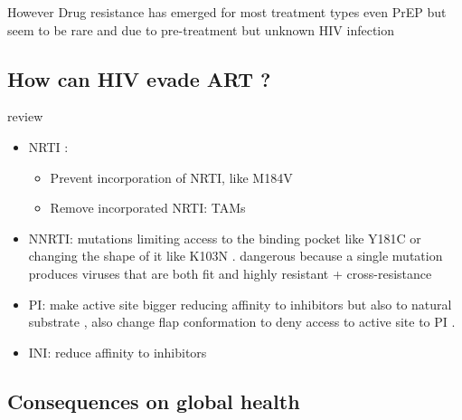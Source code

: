 \documentclass[
  11pt,
  twoside]{scrbook}
\providecommand{\tightlist}{%
  \setlength{\itemsep}{0pt}\setlength{\parskip}{0pt}}
\begin{document}
However Drug resistance has emerged for most treatment types even PrEP \autocite{knoxMultidrugResistantHIV1Infection2017,hurtPreexposureProphylaxisAntiretroviral2011} but seem to be rare and due to pre-treatment but unknown HIV infection \autocite{gibasDrugResistanceHIV2019}

\hypertarget{how-can-hiv-evade-art}{%
\subsection{How can HIV evade ART ?}\label{how-can-hiv-evade-art}}

review \autocite{ammaranondMechanismHIVAntiretroviral2012,clavelHIVDrugResistance2004}

\begin{itemize}
\tightlist
\item
  NRTI \autocite{menendez-ariasMechanismsResistanceNucleoside2008,sluis-cremerMolecularMechanismsHIV12000}:

  \begin{itemize}
  \item
    Prevent incorporation of NRTI, like M184V \autocite{sarafianosLamivudine3TCResistance1999}
  \item
    Remove incorporated NRTI: TAMs \autocite{meyerMechanismAZTResistance1999,boyerSelectiveExcisionAZTMP2001}
  \end{itemize}
\item
  NNRTI: mutations limiting access to the binding pocket like Y181C or changing the shape of it like K103N \autocite{deeksNonnucleosideReverseTranscriptase2001}. dangerous because a single mutation produces viruses that are both fit and highly resistant \autocite{ammaranondMechanismHIVAntiretroviral2012} + cross-resistance
\item
  PI: make active site bigger reducing affinity to inhibitors but also to natural substrate \autocite{wensingFifteenYearsHIV2010}, also change flap conformation to deny access to active site to PI \autocite{kurtyilmazImprovingViralProtease2016}.
\item
  INI: reduce affinity to inhibitors \autocite{blancoHIV1IntegraseInhibitor2011}
\end{itemize}

\hypertarget{consequences-on-global-health}{%
\subsection{Consequences on global health}\label{consequences-on-global-health}}
\end{document}

